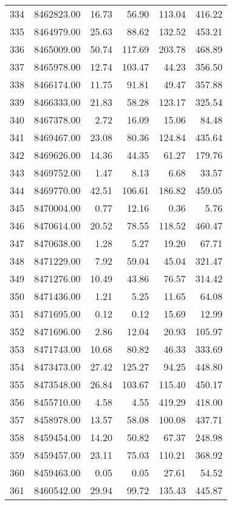 \begin{table}[ht]
\begin{tabular}{rrrrrr}
  334 & 8462823.00 & 16.73 & 56.90 & 113.04 & 416.22 \\ 
  335 & 8464979.00 & 25.63 & 88.62 & 132.52 & 453.21 \\ 
  336 & 8465009.00 & 50.74 & 117.69 & 203.78 & 468.89 \\ 
  337 & 8465978.00 & 12.74 & 103.47 & 44.23 & 356.50 \\ 
  338 & 8466174.00 & 11.75 & 91.81 & 49.47 & 357.88 \\ 
  339 & 8466333.00 & 21.83 & 58.28 & 123.17 & 325.54 \\ 
  340 & 8467378.00 & 2.72 & 16.09 & 15.06 & 84.48 \\ 
  341 & 8469467.00 & 23.08 & 80.36 & 124.84 & 435.64 \\ 
  342 & 8469626.00 & 14.36 & 44.35 & 61.27 & 179.76 \\ 
  343 & 8469752.00 & 1.47 & 8.13 & 6.68 & 33.57 \\ 
  344 & 8469770.00 & 42.51 & 106.61 & 186.82 & 459.05 \\ 
  345 & 8470004.00 & 0.77 & 12.16 & 0.36 & 5.76 \\ 
  346 & 8470614.00 & 20.52 & 78.55 & 118.52 & 460.47 \\ 
  347 & 8470638.00 & 1.28 & 5.27 & 19.20 & 67.71 \\ 
  348 & 8471229.00 & 7.92 & 59.04 & 45.04 & 321.47 \\ 
  349 & 8471276.00 & 10.49 & 43.86 & 76.57 & 314.42 \\ 
  350 & 8471436.00 & 1.21 & 5.25 & 11.65 & 64.08 \\ 
  351 & 8471695.00 & 0.12 & 0.12 & 15.69 & 12.99 \\ 
  352 & 8471696.00 & 2.86 & 12.04 & 20.93 & 105.97 \\ 
  353 & 8471743.00 & 10.68 & 80.82 & 46.33 & 333.69 \\ 
  354 & 8473473.00 & 27.42 & 125.27 & 94.25 & 448.80 \\ 
  355 & 8473548.00 & 26.84 & 103.67 & 115.40 & 450.17 \\ 
  356 & 8455710.00 & 4.58 & 4.55 & 419.29 & 418.00 \\ 
  357 & 8458978.00 & 13.57 & 58.08 & 100.08 & 437.71 \\ 
  358 & 8459454.00 & 14.20 & 50.82 & 67.37 & 248.98 \\ 
  359 & 8459457.00 & 23.11 & 75.03 & 110.21 & 368.92 \\ 
  360 & 8459463.00 & 0.05 & 0.05 & 27.61 & 54.52 \\ 
  361 & 8460542.00 & 29.94 & 99.72 & 135.43 & 445.87 \\ 

\end{tabular}
\end{table}
